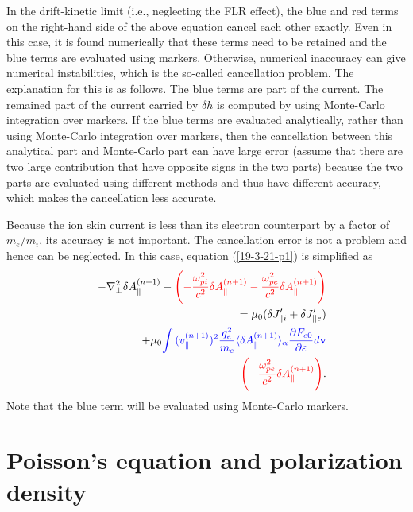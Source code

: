 \documentclass{article}
\newcommand{\tmcolor}[2]{{\color{#1}{#2}}}
\begin{document}
In the drift-kinetic limit (i.e., neglecting the FLR effect), the blue and red
terms on the right-hand side of the above equation cancel each other exactly.
Even in this case, it is found numerically that these terms need to be
retained and the blue terms are evaluated using markers. Otherwise, numerical
inaccuracy can give numerical instabilities, which is the so-called
cancellation problem. The explanation for this is as follows. The blue terms
are part of the current. The remained part of the current carried by $\delta
h$ is computed by using Monte-Carlo integration over markers. If the blue
terms are evaluated analytically, rather than using Monte-Carlo integration
over markers, then the cancellation between this analytical part and
Monte-Carlo part can have large error (assume that there are two large
contribution that have opposite signs in the two parts) because the two parts
are evaluated using different methods and thus have different accuracy, which
makes the cancellation less accurate.

Because the ion skin current is less than its electron counterpart by a factor
of $m_e / m_i$, its accuracy is not important. The cancellation error is not a
problem and hence can be neglected. In this case, equation (\ref{19-3-21-p1})
is simplified as
\begin{eqnarray}
  &  & - \nabla^2_{\perp} \delta A_{\parallel}^{(n + 1)} -
  \tmcolor{red}{\left( - \frac{\omega_{p i}^2}{c^2} \delta A_{\parallel}^{(n +
  1)} - \frac{\omega_{p e}^2}{c^2} \delta A_{\parallel}^{(n + 1)} \right)}
  \nonumber\\
  &  & = \mu_0 (\delta J_{\parallel i}' + \delta J'_{||e}) \nonumber\\
  &  & + \mu_0 \tmcolor{blue}{\int {(v_{\parallel}^{(n + 1)})^2} 
  \frac{q^2_e}{m_e} \langle \delta A_{\parallel}^{(n + 1)} \rangle_{\alpha}
  \frac{\partial F_{e 0}}{\partial \varepsilon} d\mathbf{v}} \nonumber\\
  &  & - \tmcolor{red}{\left( - \frac{\omega_{p e}^2}{c^2} \delta
  A_{\parallel}^{(n + 1)} \right)} .  \label{19-3-25-p1}
\end{eqnarray}
Note that the blue term will be evaluated using Monte-Carlo markers.

\section{Poisson's equation and polarization density}\label{19-1-4-1}
\end{document}

